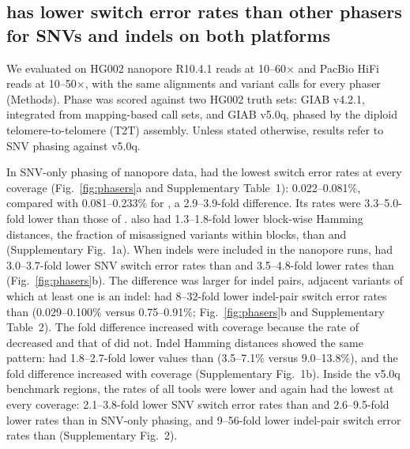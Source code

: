 \subsection*{\toolname has lower switch error rates than other phasers for SNVs and indels on both platforms}
We evaluated \toolname on HG002 nanopore R10.4.1 reads at 10--60$\times$ and PacBio HiFi reads at 10--50$\times$, with the same alignments and variant calls for every phaser (Methods). Phase was scored against two HG002 truth sets: GIAB v4.2.1, integrated from mapping-based call sets, and GIAB v5.0q, phased by the diploid telomere-to-telomere (T2T) assembly. Unless stated otherwise, results refer to SNV phasing against v5.0q.

In SNV-only phasing of nanopore data, \toolname had the lowest switch error rates at every coverage (Fig.~\ref{fig:phasers}a and Supplementary Table~1): 0.022--0.081\%, compared with 0.081--0.233\% for \whatshap, a 2.9--3.9-fold difference. Its rates were 3.3--5.0-fold lower than those of \hapcut. \toolname also had 1.3--1.8-fold lower block-wise Hamming distances, the fraction of misassigned variants within blocks, than \whatshap and \hapcut (Supplementary Fig.~1a). When indels were included in the nanopore runs, \toolname had 3.0--3.7-fold lower SNV switch error rates than \whatshap and 3.5--4.8-fold lower rates than \hapcut (Fig.~\ref{fig:phasers}b). The difference was larger for indel pairs, adjacent variants of which at least one is an indel: \toolname had 8--32-fold lower indel-pair switch error rates than \whatshap (0.029--0.100\% versus 0.75--0.91\%; Fig.~\ref{fig:phasers}b and Supplementary Table~2). The fold difference increased with coverage because the rate of \toolname decreased and that of \whatshap did not. Indel Hamming distances showed the same pattern: \toolname had 1.8--2.7-fold lower values than \whatshap (3.5--7.1\% versus 9.0--13.8\%), and the fold difference increased with coverage (Supplementary Fig.~1b). Inside the v5.0q benchmark regions, the rates of all tools were lower and \toolname again had the lowest at every coverage: 2.1--3.8-fold lower SNV switch error rates than \whatshap and 2.6--9.5-fold lower rates than \hapcut in SNV-only phasing, and 9--56-fold lower indel-pair switch error rates than \whatshap (Supplementary Fig.~2).

